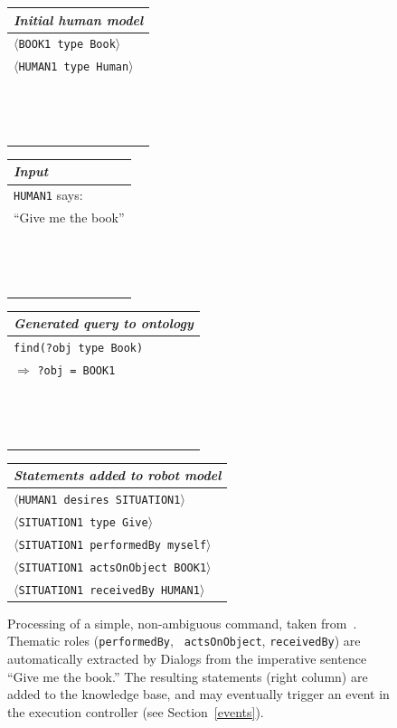 \documentclass[preprint,3p,times]{elsarticle}
\newcommand{\concept}[1]{{\small \texttt{#1}}}
\newcommand{\stmt}[1]{{\footnotesize\tt$\langle$#1\relax$\rangle$}}
\begin{document}
\begin{figure}
    \centering
    \begin{tabular}{l}
        \emph{Initial human model} \\
        \hline
        \stmt{BOOK1 type Book} \\
        \stmt{HUMAN1 type Human} \\
        ~\\
        ~\\
        ~\\
    \end{tabular}
    \begin{tabular}{l}
        \emph{Input}\\

        \hline

        \concept{HUMAN1} says:\\
        ``Give me the book'' \\
        ~\\
        ~\\
        ~\\

    \end{tabular}
    \begin{tabular}{l}

        \emph{Generated query to ontology} \\
        \hline
        \concept{find(?obj type Book)} \\ 
        \hspace{0.2cm}$\Rightarrow$ \concept{?obj = BOOK1} \\
        ~\\
        ~\\
        ~\\
    \end{tabular}
    \begin{tabular}{l}

        \emph{Statements added to robot model}\\
        \hline
        \stmt{HUMAN1 desires SITUATION1} \\
         \stmt{SITUATION1 type Give} \\
         \stmt{SITUATION1 performedBy myself} \\
         \stmt{SITUATION1 actsOnObject BOOK1} \\
         \stmt{SITUATION1 receivedBy HUMAN1} \\
    \end{tabular}

    \caption{Processing of a simple, non-ambiguous command, taken
        from~\cite{Lemaignan2011a}. Thematic roles ({\tt performedBy}, {\tt
        actsOnObject}, {\tt receivedBy}) are automatically extracted by 
    {\sc Dialogs} from the imperative sentence ``Give me the book.'' The 
    resulting statements (right column) are added to the knowledge base, and
    may eventually trigger an event in the execution controller (see
    Section~\ref{events}).}

    \label{dialogs|ex}
\end{figure}
\end{document}
